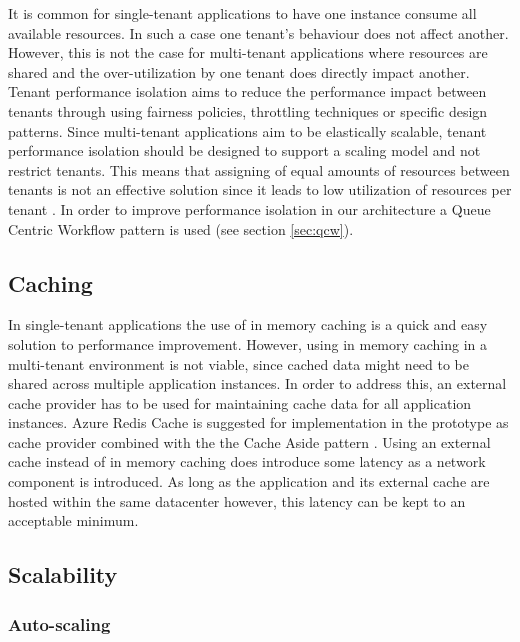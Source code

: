 It is common for single-tenant applications to have one instance consume all available resources. In such a case one tenant's behaviour does not affect another. However, this is not the case for multi-tenant applications where resources are shared and the over-utilization by one tenant does directly impact another. Tenant performance isolation aims to reduce the performance impact between tenants through using fairness policies, throttling techniques or specific design patterns. Since multi-tenant applications aim to be elastically scalable, tenant performance isolation should be designed to support a scaling model and not restrict tenants. This means that assigning of equal amounts of resources between tenants is not an effective solution since it leads to low utilization of resources per tenant \cite{Bezemer:2010:MSA:1862372.1862393}. In order to improve performance isolation in our architecture a Queue Centric Workflow pattern is used (see section \ref{sec:qcw}). 

\subsection{Caching}

In single-tenant applications the use of in memory caching is a quick and easy solution to performance improvement. However, using in memory caching in a multi-tenant environment is not viable, since cached data might need to be shared across multiple application instances. In order to address this, an external cache provider has to be used for maintaining cache data for all application instances. Azure Redis Cache  is suggested for implementation in the prototype  as cache provider combined with the the Cache Aside pattern \cite{Homer2014}. Using an external cache instead of in memory caching does introduce some latency as a network component is introduced. As long as the application and its external cache are hosted within the same datacenter however, this latency can be kept to an acceptable minimum.


\subsection{Scalability}
\label{sec:scalability}

\subsubsection{\textbf{Auto-scaling}}

